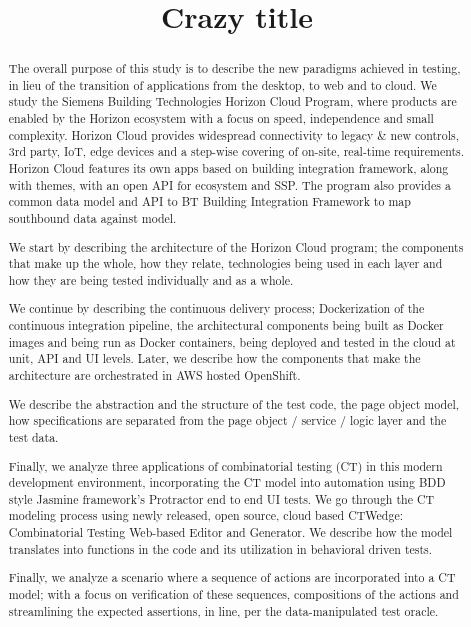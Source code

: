 \documentclass[conference]{IEEEtran}
\begin{document}
\title{Crazy title}


\author{
}

\maketitle


\begin{abstract}
The overall purpose of this study is to describe the new paradigms achieved in testing,
in lieu of the transition of applications from the desktop, to web and to cloud. 
We study the Siemens Building Technologies Horizon Cloud Program,
where products are enabled by the Horizon ecosystem with a focus on speed, independence and small complexity.
Horizon Cloud provides widespread connectivity to legacy \& new controls, 3rd party, IoT, 
edge devices and a step-wise covering of on-site, real-time requirements. 
Horizon Cloud features its own apps based on building integration framework, along with themes, with an open API for ecosystem and SSP. 
The program also provides a common data model and API to BT Building Integration Framework to map southbound data against model.

We start by describing the architecture of the Horizon Cloud program; the components that make up the whole, how they relate, 
technologies being used in each layer and how they are being tested individually and as a whole. 	

We continue by describing the continuous delivery process; Dockerization of the continuous integration pipeline,
the architectural components being built as Docker images and being run as Docker containers, being deployed and tested in the cloud at unit, API and UI levels. 
Later, we describe how the components that make the architecture are orchestrated in AWS hosted OpenShift. 

We describe the abstraction and the structure of the test code, the page object model, 
how specifications are separated from the page object / service / logic layer and the test data. 

Finally, we analyze three applications of combinatorial testing (CT) in this modern development environment,
incorporating the CT model into automation using BDD style Jasmine framework’s Protractor end to end UI tests. 
We go through the CT modeling process using newly released, open source, cloud based CTWedge: Combinatorial Testing Web-based Editor and Generator. 
We describe how the model translates into functions in the code and its utilization in behavioral driven tests.

Finally, we analyze a scenario where a sequence of actions are incorporated into a CT model;
with a focus on verification of these sequences, compositions of the actions and streamlining the expected assertions,
in line, per the data-manipulated test oracle.

\end{abstract}
\end{document}
